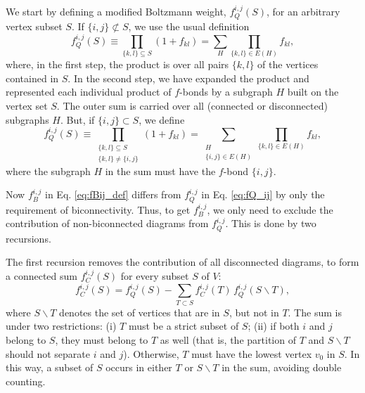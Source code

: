 \documentclass[aip,jcp,preprint,superscriptaddress,showpacs,preprintnumbers,amsmath,amssymb]{revtex4-1}
\numberwithin{equation}{section}
\begin{document}
We start by defining a modified Boltzmann weight,
$f_Q^{i,j}(S)$, for an arbitrary vertex subset $S$.
%
If $\{i, j\} \not\subset S$,
we use the usual definition
%
\[
f_Q^{i,j}(S)
\equiv
\prod_{\{k,l\}\subseteq S} (1 + f_{kl})
=
\sum_H
\prod_{\{k,l\} \in E(H)} f_{kl},
\]
%
where, in the first step,
the product is over all pairs $\{k, l\}$
of the vertices contained in $S$.
%
In the second step,
we have expanded the product
and represented each individual product of $f$-bonds
by a subgraph $H$ built on the vertex set $S$.
%
The outer sum is carried over all
(connected or disconnected) subgraphs $H$.
%
But, if $\{i, j\} \subset S$,
we define
%
%
%
\begin{equation}
f_Q^{i,j}(S)
\equiv
\prod_{ \substack{
  \{k,l\}\subseteq S \\
  \{k,l\} \ne \{i, j\} } }
(1 + f_{kl})
=
\sum_{ \substack{
  H \\
  \{i, j\} \in E(H) } }
\prod_{\{k,l\} \in E(H)} f_{kl},
\label{eq:fQ_ij}
\end{equation}
%
%
%
where the subgraph $H$
in the sum must have the $f$-bond $\{i, j\}$.



Now $f_B^{i,j}$ in Eq. \eqref{eq:fBij_def}
differs from $f_Q^{i,j}$ in Eq. \eqref{eq:fQ_ij}
by only the requirement of biconnectivity.
%
Thus,
to get $f_B^{i,j}$,
we only need to exclude the contribution of non-biconnected
diagrams from $f_Q^{i,j}$.
%
This is done by two recursions\cite{wheatley2013}.



The first recursion removes the contribution
of all disconnected diagrams,
to form a connected sum $f_C^{i,j}(S)$
for every subset $S$ of $V$\cite{wheatley2013}:
%
%
%
\begin{equation}
f_C^{i,j}(S)
=
f_Q^{i,j}(S)
-
\sum_{T \subset S}
f_C^{i,j}(T) \, f_Q^{i,j}(S \backslash T),
\label{eq:fC_from_fQ}
\end{equation}
%
%
%
where $S\backslash T$ denotes the set of vertices
that are in $S$, but not in $T$.
%
The sum is under two restrictions:
%
(i) $T$ must be a strict subset of $S$;
%
(ii) if both $i$ and $j$ belong to $S$,
they must belong to $T$ as well
(that is, the partition of $T$ and $S \backslash T$
should not separate $i$ and $j$).
%
Otherwise, $T$ must have the lowest vertex $v_0$ in $S$.
%
In this way,
a subset of $S$ occurs in either $T$ or $S \backslash T$
in the sum,
avoiding double counting.
\end{document}
